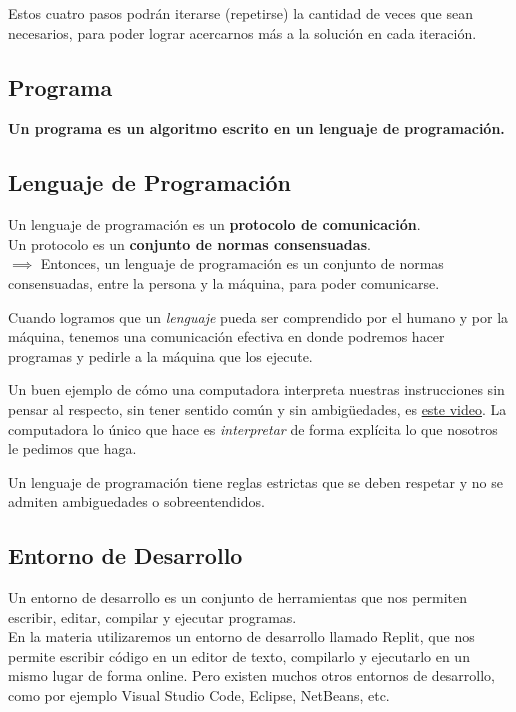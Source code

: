 \documentclass[
  letterpaper,
  DIV=11,
  numbers=noendperiod]{scrreprt}
\begin{document}
Estos cuatro pasos podrán iterarse (repetirse) la cantidad de veces que
sean necesarios, para poder lograr acercarnos más a la solución en cada
iteración.

\subsection{Programa}\label{programa}

\textbf{Un programa es un algoritmo escrito en un lenguaje de
programación.}

\subsection{Lenguaje de Programación}\label{lenguaje-de-programaciuxf3n}

Un lenguaje de programación es un \textbf{protocolo de comunicación}.\\
Un protocolo es un \textbf{conjunto de normas consensuadas}.\\
\(\implies\) Entonces, un lenguaje de programación es un conjunto de
normas consensuadas, entre la persona y la máquina, para poder
comunicarse.

Cuando logramos que un \emph{lenguaje} pueda ser comprendido por el
humano y por la máquina, tenemos una comunicación efectiva en donde
podremos hacer programas y pedirle a la máquina que los ejecute.

Un buen ejemplo de cómo una computadora interpreta nuestras
instrucciones sin pensar al respecto, sin tener sentido común y sin
ambigüedades, es \href{https://www.youtube.com/watch?v=cDA3_5982h8}{este
video}. La computadora lo único que hace es \emph{interpretar} de forma
explícita lo que nosotros le pedimos que haga.

Un lenguaje de programación tiene reglas estrictas que se deben respetar
y no se admiten ambiguedades o sobreentendidos.

\subsection{Entorno de Desarrollo}\label{entorno-de-desarrollo}

Un entorno de desarrollo es un conjunto de herramientas que nos permiten
escribir, editar, compilar y ejecutar programas.\\

En la materia utilizaremos un entorno de desarrollo llamado Replit, que
nos permite escribir código en un editor de texto, compilarlo y
ejecutarlo en un mismo lugar de forma online. Pero existen muchos otros
entornos de desarrollo, como por ejemplo Visual Studio Code, Eclipse,
NetBeans, etc.
\end{document}
